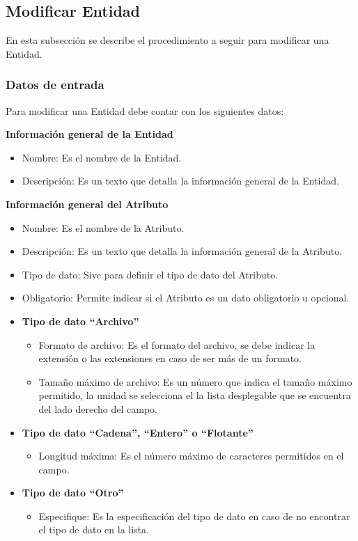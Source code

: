\subsection{Modificar Entidad}
En esta subsección se describe el procedimiento a seguir para modificar una Entidad.

\subsubsection{Datos de entrada}
\begin{description}
	\item Para modificar una Entidad debe contar con los siguientes datos: \hspace{10pt}
	\begin{description}
	    \item \textbf{Información general de la Entidad}
	    \begin{itemize}
		  \item Nombre: Es el nombre de la Entidad.
		  \item Descripción: Es un texto que detalla la información general de la Entidad.
	    \end{itemize}
	    \item \textbf{Información general del Atributo}
	    \begin{itemize}
		  \item Nombre: Es el nombre de la Atributo.
		  \item Descripción: Es un texto que detalla la información general de la Atributo.
		  \item Tipo de dato: Sive para definir el tipo de dato del Atributo.
		  \item Obligatorio: Permite indicar si el Atributo es un dato obligatorio u opcional.
		  \item {\bf Tipo de dato ``Archivo''}
		  \begin{itemize}
		   \item Formato de archivo: Es el formato del archivo, se debe indicar la extensión o las extensiones en caso de ser más de un formato.
		   \item Tamaño máximo de archivo: Es un número que indica el tamaño máximo permitido, la unidad se selecciona el la lista desplegable que se encuentra del lado derecho del campo.
		  \end{itemize}
		  \item {\bf Tipo de dato ``Cadena'', ``Entero'' o ``Flotante''}
		  \begin{itemize}
		   \item Longitud máxima: Es el número máximo de caracteres permitidos en el campo.
		  \end{itemize}
		  \item {\bf Tipo de dato ``Otro''}
		  \begin{itemize}
		   \item Especifique: Es la especificación del tipo de dato en caso de no encontrar el tipo de dato en la lista.
		  \end{itemize}
		  
	    \end{itemize}
	 \end{description}
\end{description}

